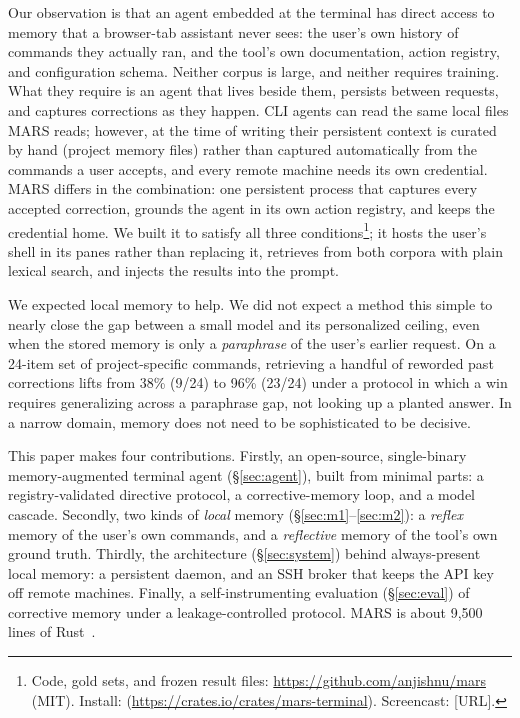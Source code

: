 Our observation is that an agent embedded at the terminal has direct access to memory
that a browser-tab assistant never sees: the user's own history of commands they
actually ran, and the tool's own documentation, action registry, and configuration
schema. Neither corpus is
large, and neither requires training. What they require is an agent that lives beside
them, persists between requests, and captures corrections as they happen. CLI agents
can read the same local files MARS reads; however, at
the time of writing their persistent context is curated by hand (project memory files)
rather than captured automatically from the commands a user accepts, and every remote
machine needs its own credential. MARS differs in the combination: one persistent
process that captures every accepted correction, grounds the agent in its own action
registry, and keeps the credential home. We built
it to satisfy all three conditions\footnote{Code, gold sets, and frozen result files:
\url{https://github.com/anjishnu/mars} (MIT). Install:
(\url{https://crates.io/crates/mars-terminal}). Screencast: [URL].}; it hosts the
user's shell in its panes rather than replacing it, retrieves from both corpora with
plain lexical search, and injects the results into the prompt.

We expected local memory to help. We did not expect a method this simple to nearly close
the gap between a small model and its personalized ceiling, even when the stored memory
is only a \emph{paraphrase} of the user's earlier request. On a 24-item set of
project-specific commands, retrieving a handful of reworded past corrections lifts
 from 38\% (9/24) to 96\% (23/24) under a protocol in which
a win requires generalizing across a paraphrase gap, not looking up a planted answer. In a narrow domain, memory does not
need to be sophisticated to be decisive.

This paper makes four contributions. Firstly, an open-source, single-binary
memory-augmented terminal agent (\S\ref{sec:agent}), built from minimal parts: a registry-validated directive protocol, a
corrective-memory loop, and a model cascade. Secondly, two kinds of \emph{local} memory
(\S\ref{sec:m1}--\ref{sec:m2}): a \emph{reflex} memory of the user's own commands, and
a \emph{reflective} memory of the tool's own ground truth. Thirdly, the architecture (\S\ref{sec:system}) behind always-present
local memory: a persistent daemon, and an SSH broker that
keeps the API key off remote machines. Finally, a self-instrumenting evaluation
(\S\ref{sec:eval}) of corrective memory under a leakage-controlled protocol. MARS is about 9{,}500 lines of
Rust~\citep{kumar2026mars}.
